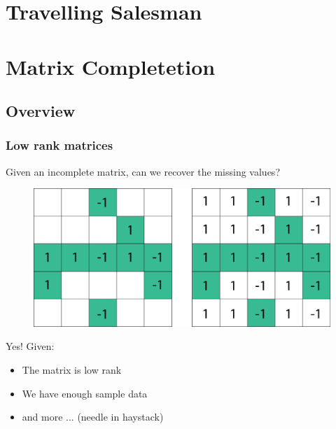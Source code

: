 \documentclass[
	11pt, %
]{beamer}
\begin{document}
\section{Travelling Salesman}

\section{Matrix Completetion} %


\subsection{Overview}
%
\begin{frame}
	\frametitle{Low rank matrices}
	\begin{center}
		Given an incomplete matrix, can we recover the missing values?
	\end{center}
	\begin{figure}
		\centering 
		\includegraphics[scale=.3]{assets/mc1.jpg}
	\end{figure}
\end{frame}


\begin{frame}
	Yes!
	Given:
	\begin{itemize}
		\item The matrix is low rank 
		\item We have enough sample data 
		\item and more ...  (needle in haystack)
	\end{itemize}
\end{frame}
\end{document}
